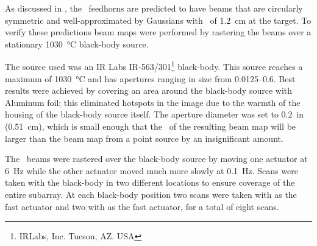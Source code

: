 As discussed in , the \Imager\ feedhorns are predicted to have beams that are circularly symmetric and well-approximated by Gaussians with \FWHM\ of \SI{1.2}{\cm} at the target.
To verify these predictions beam maps were performed by rastering the beams over a stationary \SI{1030}{\celsius} black-body source.

The source used was an IR Labs IR-563/301\footnote{IRLabs, Inc. Tucson, AZ. USA} black-body.
This source reaches a maximum of \SI{1030}{\celsius} and has apertures ranging in size from \SIrange{0.0125}{0.6}{\in}.
Best results were achieved by covering an area around the black-body source with Aluminum foil; this eliminated hotspots in the image due to the warmth of the housing of the black-body source itself.
The aperture diameter was set to \SI{0.2}{in} (\SI{0.51}{\cm}), which is small enough that the \FWHM\ of the resulting beam map will be larger than the beam map from a point source by an insignificant amount.

The \Imager\ beams were rastered over the black-body source by moving one actuator at \SI{6}{\hertz} while the other actuator moved much more slowly at \SI{0.1}{\hertz}.
Scans were taken with the black-body in two different locations to ensure coverage of the entire subarray.
At each black-body position two scans were taken with  as the fast actuator and two with  as the fast actuator, for a total of eight scans.


